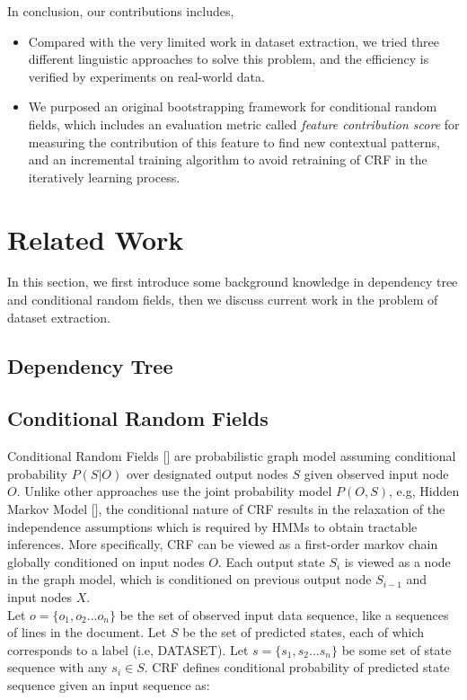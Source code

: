 \documentclass[10pt]{article}
\begin{document}
In conclusion, our contributions includes,
\begin{itemize}
\item Compared with the very limited work in dataset extraction, we tried three different linguistic approaches to solve this problem, and the efficiency is verified by experiments on real-world data.
\item We purposed an original bootstrapping framework for conditional random fields, which includes an evaluation metric called \emph{feature contribution score} for measuring the contribution of this feature to find new contextual patterns, and an incremental training algorithm to avoid retraining of CRF in the iteratively learning process. 
\end{itemize}

\section{Related Work}
In this section, we first introduce some background knowledge in dependency tree and conditional random fields, then we discuss current work in the problem of dataset extraction.
\subsection{Dependency Tree}

\subsection{Conditional Random Fields}
Conditional Random Fields [] are probabilistic graph model assuming conditional probability $P(S|O)$ over designated output nodes $S$ given observed input node $O$. Unlike other approaches use the joint probability model $P(O,S)$, e.g, Hidden Markov Model [], the conditional nature of CRF results in the relaxation of the independence assumptions which is required by HMMs to obtain tractable inferences. More specifically, CRF can be viewed as a first-order markov chain globally conditioned on input nodes $O$. Each output state $S_i$ is viewed as a node in the graph model, which is conditioned on previous output node $S_{i-1}$ and input nodes $X$. \\

Let $o =\{o_1, o_2 ... o_n \}$ be the set of observed input data sequence, like a sequences of lines in the document. Let $S$ be the set of predicted states, each of which corresponds to a label (i.e, DATASET). Let $s = \{ s_1, s_2 ... s_n\}$ be some set of state sequence with any $s_i \in S$. CRF defines conditional probability of predicted state sequence given an input sequence as: 
\end{document}

